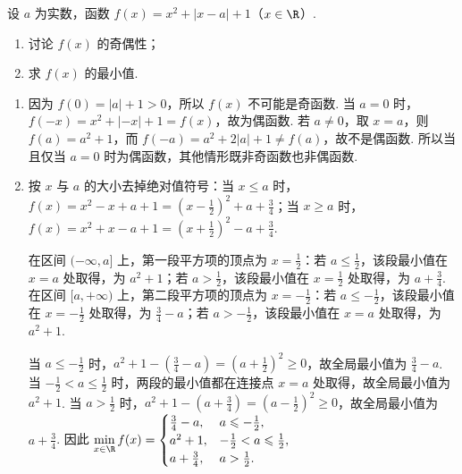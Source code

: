 \begin{problem}
设 \(a\) 为实数，函数 \(f(x) = x^{2} + |x - a| + 1\)（\(x \in \R\)）.

\begin{enumerate}
\item 讨论 \(f(x)\) 的奇偶性；
\item 求 \(f(x)\) 的最小值.
\end{enumerate}
\end{problem}

\begin{solution}
\begin{enumerate}
\item 因为 \(f(0)=|a|+1>0\)，所以 \(f(x)\) 不可能是奇函数. 当 \(a=0\) 时，\(f(-x)=x^2+|-x|+1=f(x)\)，故为偶函数. 若 \(a\neq0\)，取 \(x=a\)，则 \(f(a)=a^2+1\)，而 \(f(-a)=a^2+2|a|+1\neq f(a)\)，故不是偶函数. 所以当且仅当 \(a=0\) 时为偶函数，其他情形既非奇函数也非偶函数.
\item 按 \(x\) 与 \(a\) 的大小去掉绝对值符号：当 \(x\leqslant a\) 时，
\(\displaystyle f(x)=x^2-x+a+1=\left(x-\frac12\right)^2+a+\frac34\)；当 \(x\geqslant a\) 时，
\(\displaystyle f(x)=x^2+x-a+1=\left(x+\frac12\right)^2-a+\frac34\).

在区间 \((-\infty,a]\) 上，第一段平方项的顶点为 \(x=\frac12\)：若 \(a\leqslant\frac12\)，该段最小值在 \(x=a\) 处取得，为 \(a^2+1\)；若 \(a>\frac12\)，该段最小值在 \(x=\frac12\) 处取得，为 \(a+\frac34\). 在区间 \([a,+\infty)\) 上，第二段平方项的顶点为 \(x=-\frac12\)：若 \(a\leqslant-\frac12\)，该段最小值在 \(x=-\frac12\) 处取得，为 \(\frac34-a\)；若 \(a>-\frac12\)，该段最小值在 \(x=a\) 处取得，为 \(a^2+1\).

当 \(a\leqslant-\frac12\) 时，\(\displaystyle a^2+1-\left(\frac34-a\right)=\left(a+\frac12\right)^2\geqslant0\)，故全局最小值为 \(\frac34-a\). 当 \(-\frac12<a\leqslant\frac12\) 时，两段的最小值都在连接点 \(x=a\) 处取得，故全局最小值为 \(a^2+1\). 当 \(a>\frac12\) 时，\(\displaystyle a^2+1-\left(a+\frac34\right)=\left(a-\frac12\right)^2\geqslant0\)，故全局最小值为 \(a+\frac34\). 因此
\(\displaystyle\min_{x\in\R}f(x)=\begin{cases}
\frac34-a,&a\leqslant-\frac12,\\
a^2+1,&-\frac12<a\leqslant\frac12,\\
a+\frac34,&a>\frac12.
\end{cases}\)
\end{enumerate}
\end{solution}

